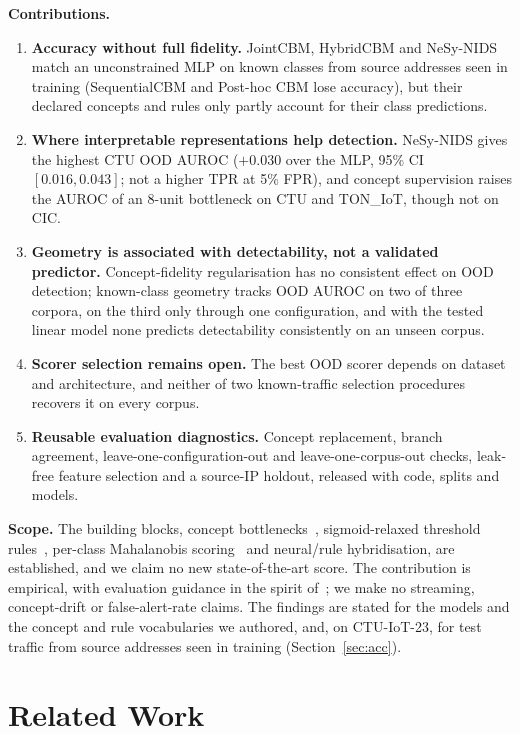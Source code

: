 \documentclass[journal]{IEEEtran}
\begin{document}
\smallskip
\noindent\textbf{Contributions.}
\begin{enumerate}
  \item \textbf{Accuracy without full fidelity.} JointCBM, HybridCBM and NeSy-NIDS match an unconstrained MLP on known classes from source addresses seen in training (SequentialCBM and Post-hoc CBM lose accuracy), but their declared concepts and rules only partly account for their class predictions.
  \item \textbf{Where interpretable representations help detection.} NeSy-NIDS gives the highest CTU OOD AUROC ($+0.030$ over the MLP, 95\% CI $[0.016, 0.043]$; not a higher TPR at 5\% FPR), and concept supervision raises the AUROC of an 8-unit bottleneck on CTU and TON\_IoT, though not on CIC.
  \item \textbf{Geometry is associated with detectability, not a validated predictor.} Concept-fidelity regularisation has no consistent effect on OOD detection; known-class geometry tracks OOD AUROC on two of three corpora, on the third only through one configuration, and with the tested linear model none predicts detectability consistently on an unseen corpus.
  \item \textbf{Scorer selection remains open.} The best OOD scorer depends on dataset and architecture, and neither of two known-traffic selection procedures recovers it on every corpus.
  \item \textbf{Reusable evaluation diagnostics.} Concept replacement, branch agreement, leave-one-configuration-out and leave-one-corpus-out checks, leak-free feature selection and a source-IP holdout, released with code, splits and models.
\end{enumerate}

\noindent\textbf{Scope.} The building blocks, concept bottlenecks~\cite{koh2020concept}, sigmoid-relaxed threshold rules~\cite{petersen2022logic,yang2022ste}, per-class Mahalanobis scoring~\cite{lee2018simple} and neural/rule hybridisation, are established, and we claim no new state-of-the-art score. The contribution is empirical, with evaluation guidance in the spirit of~\cite{arp2022dos}; we make no streaming, concept-drift or false-alert-rate claims. The findings are stated for the models and the concept and rule vocabularies we authored, and, on CTU-IoT-23, for test traffic from source addresses seen in training (Section~\ref{sec:acc}).

\section{Related Work}\label{sec:related}
\end{document}
